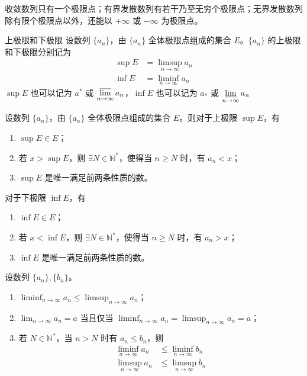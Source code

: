 \begin{remark}
    收敛数列只有一个极限点；有界发散数列有若干乃至无穷个极限点；无界发散数列除有限个极限点以外，还能以 $+\infty$ 或 $-\infty$ 为极限点。
\end{remark}

\begin{definition}{上极限和下极限}
    设数列 $\{a_n\}$，由 $\{a_n\}$ 全体极限点组成的集合 $E$。$\{a_n\}$ 的上极限和下极限分别记为
    \begin{align*}
        \sup E & = \limsup_{n \to \infty} a_n \\
        \inf E & = \liminf_{n \to \infty} a_n
    \end{align*}
    $\sup E$ 也可以记为 $a^{*}$ 或 $\displaystyle \varlimsup_{n \to \infty} a_n$，$\inf E$ 也可以记为 $a_{*}$ 或 $\displaystyle \varliminf_{n \to \infty} a_n$
\end{definition}

\begin{theorem}
    设数列 $\{a_n\}$，由 $\{a_n\}$ 全体极限点组成的集合 $E$。则对于上极限 $\sup E$，有
    \begin{enumerate}
        \item $\sup E \in E$；
        \item 若 $x > \sup E$，则 $\exists N \in \mathbb{N}^{*}$，使得当 $n \geqslant N$ 时，有 $a_n < x$；
        \item $\sup E$ 是唯一满足前两条性质的数。
    \end{enumerate}
    对于下极限 $\inf E$，有
    \begin{enumerate}
        \item $\inf E \in E$；
        \item 若 $x < \inf E$，则 $\exists N \in \mathbb{N}^{*}$，使得当 $n \geqslant N$ 时，有 $a_n > x$；
        \item $\inf E$ 是唯一满足前两条性质的数。
    \end{enumerate}
\end{theorem}

\begin{theorem}
    设数列 $\{a_n\}, \{b_n\}$。
    \begin{enumerate}
        \item $\displaystyle \liminf_{n \to \infty} a_n \leqslant \limsup_{n \to \infty} a_n$；
        \item $\displaystyle \lim_{n \to \infty} a_n = a$ 当且仅当 $\displaystyle \liminf_{n \to \infty} a_n = \limsup_{n \to \infty} a_n = a$；
        \item 若 $N \in \mathbb{N}^{*}$，当 $n > N$ 时有 $a_n \leqslant b_n$，则
              \begin{align*}
                  \liminf_{n \to \infty} a_n & \leqslant \liminf_{n \to \infty} b_n \\
                  \limsup_{n \to \infty} a_n & \leqslant \limsup_{n \to \infty} b_n
              \end{align*}
    \end{enumerate}
\end{theorem}

